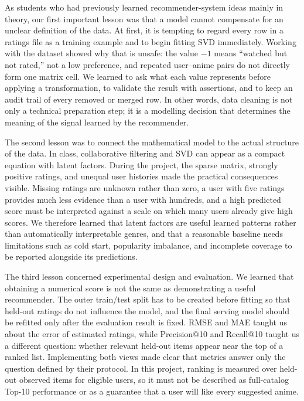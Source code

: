\documentclass[12pt,a4paper]{article}
\begin{document}
As students who had previously learned recommender-system ideas mainly in theory, our first important lesson was that a model cannot compensate for an unclear definition of the data. At first, it is tempting to regard every row in a ratings file as a training example and to begin fitting SVD immediately. Working with the dataset showed why that is unsafe: the value $-1$ means ``watched but not rated,'' not a low preference, and repeated user--anime pairs do not directly form one matrix cell. We learned to ask what each value represents before applying a transformation, to validate the result with assertions, and to keep an audit trail of every removed or merged row. In other words, data cleaning is not only a technical preparation step; it is a modelling decision that determines the meaning of the signal learned by the recommender.

The second lesson was to connect the mathematical model to the actual structure of the data. In class, collaborative filtering and SVD can appear as a compact equation with latent factors. During the project, the sparse matrix, strongly positive ratings, and unequal user histories made the practical consequences visible. Missing ratings are unknown rather than zero, a user with five ratings provides much less evidence than a user with hundreds, and a high predicted score must be interpreted against a scale on which many users already give high scores. We therefore learned that latent factors are useful learned patterns rather than automatically interpretable genres, and that a reasonable baseline needs limitations such as cold start, popularity imbalance, and incomplete coverage to be reported alongside its predictions.

The third lesson concerned experimental design and evaluation. We learned that obtaining a numerical score is not the same as demonstrating a useful recommender. The outer train/test split has to be created before fitting so that held-out ratings do not influence the model, and the final serving model should be refitted only after the evaluation result is fixed. RMSE and MAE taught us about the error of estimated ratings, while Precision@10 and Recall@10 taught us a different question: whether relevant held-out items appear near the top of a ranked list. Implementing both views made clear that metrics answer only the question defined by their protocol. In this project, ranking is measured over held-out observed items for eligible users, so it must not be described as full-catalog Top-10 performance or as a guarantee that a user will like every suggested anime.
\end{document}
